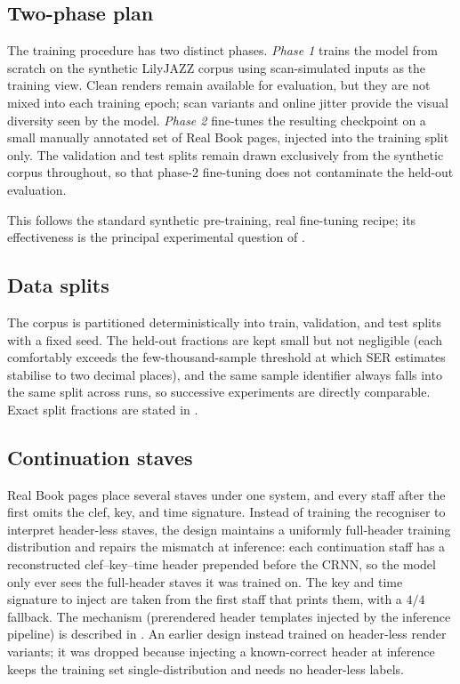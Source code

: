 \subsection{Two-phase plan}

The training procedure has two distinct phases.
\textit{Phase 1} trains the model from scratch on the synthetic
LilyJAZZ corpus using scan-simulated inputs as the training view.
Clean renders remain available for evaluation, but they are not mixed
into each training epoch; scan variants and online jitter provide the
visual diversity seen by the model.
\textit{Phase 2} fine-tunes the resulting checkpoint on a small
manually annotated set of Real Book pages, injected into the training
split only.
The validation and test splits remain drawn exclusively from the
synthetic corpus throughout, so that phase-2 fine-tuning does not
contaminate the held-out evaluation.

This follows the standard synthetic pre-training, real fine-tuning
recipe; its effectiveness is the principal experimental question of
.

\subsection{Data splits}

The corpus is partitioned deterministically into train, validation,
and test splits with a fixed seed. The held-out fractions are kept
small but not negligible (each comfortably exceeds the
few-thousand-sample threshold at which SER estimates stabilise to two
decimal places), and the same sample identifier always falls into
the same split across runs, so successive experiments are directly
comparable. Exact split fractions are stated in .

\subsection{Continuation staves}

Real Book pages place several staves under one system, and every staff
after the first omits the clef, key, and time signature.
Instead of training the recogniser to interpret header-less staves, the
design maintains a uniformly full-header training distribution and
repairs the mismatch at inference: each continuation staff has a
reconstructed clef--key--time header prepended before the CRNN, so the
model only ever sees the full-header staves it was trained on.
The key and time signature to inject are taken from the first staff
that prints them, with a $4/4$ fallback. The mechanism (prerendered
header templates injected by the inference pipeline) is described in
.
An earlier design instead trained on header-less render variants; it
was dropped because injecting a known-correct header at inference keeps
the training set single-distribution and needs no header-less labels.

